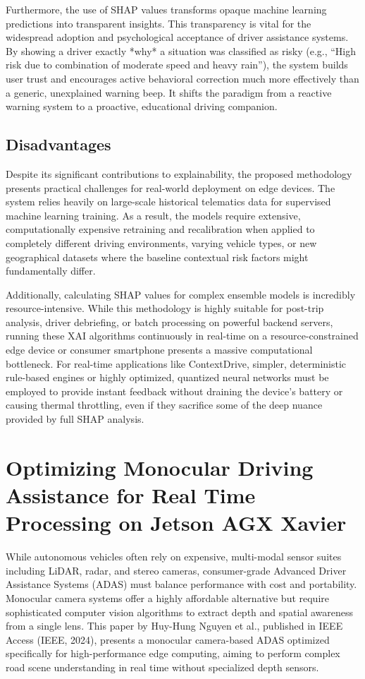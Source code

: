 Furthermore, the use of SHAP values transforms opaque machine learning predictions into transparent insights. This transparency is vital for the widespread adoption and psychological acceptance of driver assistance systems. By showing a driver exactly *why* a situation was classified as risky (e.g., ``High risk due to combination of moderate speed and heavy rain''), the system builds user trust and encourages active behavioral correction much more effectively than a generic, unexplained warning beep. It shifts the paradigm from a reactive warning system to a proactive, educational driving companion.

\subsection{Disadvantages}
Despite its significant contributions to explainability, the proposed methodology presents practical challenges for real-world deployment on edge devices. The system relies heavily on large-scale historical telematics data for supervised machine learning training. As a result, the models require extensive, computationally expensive retraining and recalibration when applied to completely different driving environments, varying vehicle types, or new geographical datasets where the baseline contextual risk factors might fundamentally differ.

Additionally, calculating SHAP values for complex ensemble models is incredibly resource-intensive. While this methodology is highly suitable for post-trip analysis, driver debriefing, or batch processing on powerful backend servers, running these XAI algorithms continuously in real-time on a resource-constrained edge device or consumer smartphone presents a massive computational bottleneck. For real-time applications like ContextDrive, simpler, deterministic rule-based engines or highly optimized, quantized neural networks must be employed to provide instant feedback without draining the device's battery or causing thermal throttling, even if they sacrifice some of the deep nuance provided by full SHAP analysis.
\section{Optimizing Monocular Driving Assistance for Real Time Processing on Jetson AGX Xavier}

While autonomous vehicles often rely on expensive, multi-modal sensor suites including LiDAR, radar, and stereo cameras, consumer-grade Advanced Driver Assistance Systems (ADAS) must balance performance with cost and portability. Monocular camera systems offer a highly affordable alternative but require sophisticated computer vision algorithms to extract depth and spatial awareness from a single lens. This paper by Huy-Hung Nguyen et al., published in IEEE Access (IEEE, 2024), presents a monocular camera-based ADAS optimized specifically for high-performance edge computing, aiming to perform complex road scene understanding in real time without specialized depth sensors.

